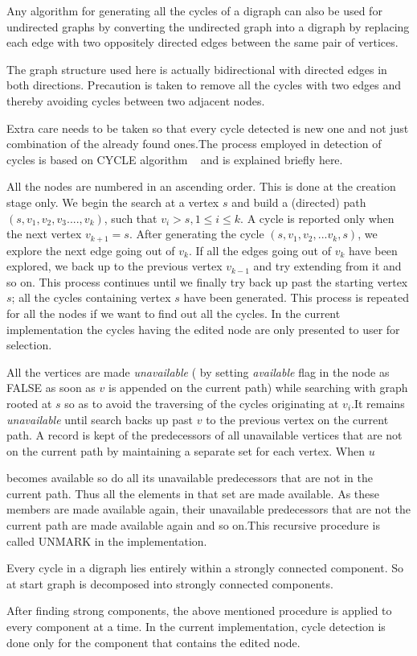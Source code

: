         Any algorithm for generating all the cycles of a
    digraph can also be used for undirected graphs by converting the undirected
    graph into a digraph by replacing each edge with two oppositely directed
    edges between the same pair of vertices.~\cite{Rein}


        The graph structure used here is actually bidirectional with directed
    edges in both directions. Precaution is taken to remove all the cycles with
    two edges and  thereby avoiding cycles between two adjacent nodes.


        Extra care needs to be taken so that every cycle detected is new one and
    not just combination of the already found ones.The process employed in
    detection of cycles is based on CYCLE algorithm ~\cite{Rein} and
    is explained briefly here.


    All the nodes are numbered in an ascending order. This is done at the
    creation stage only. We begin the search at a vertex $s$ and build a
    (directed) path $(s,v_{1},v_{2},v_{3}....,v_{k})$, such that
    $ v_{i} > s, 1 \leq i \leq k$.
    A cycle is reported only when the next vertex $ v_{k+1} = s $.
    After generating the cycle $ (s, v_{1},v_{2},... v_{k},s) $,
    we explore the next edge going out of $v_{k}$. If all the edges going out
    of $v_{k}$ have been explored, we back up to the previous vertex
    $ v_{k-1}$ and try extending from it and so on. This process continues
    until we finally try back up past the starting vertex $ s $;
    all the cycles containing vertex $ s$ have been generated. This process is
    repeated for all the nodes if we want to find out all the cycles. In the
    current implementation the cycles having the edited node are only presented
    to user for selection.


    All the vertices are made {\em unavailable} ( by setting {\em available }
    flag in the node as FALSE as soon as $ v $ is appended on the current path)
    while searching with graph rooted at $ s $ so as to avoid the traversing of
    the cycles originating at $ v_{i}$.It remains {\em unavailable} until search
    backs up past $ v $ to the previous vertex on the current path. A record is
    kept of the predecessors of all unavailable vertices that are not on the
    current path by maintaining a separate set for each vertex. When $ u $

    becomes available so do all its unavailable predecessors that are not in
    the current path. Thus all the elements in that set are made available. As
    these members are made available again, their unavailable predecessors that
    are not the current path are made available again and so on.This recursive
    procedure is called UNMARK in the implementation.


    Every cycle in a digraph lies entirely within a strongly connected
    component. So at start graph is decomposed into strongly connected
    components.


    After finding strong components, the above mentioned procedure is applied
    to every component at a time. In the current implementation, cycle
    detection is done only for the component that contains the edited node.


